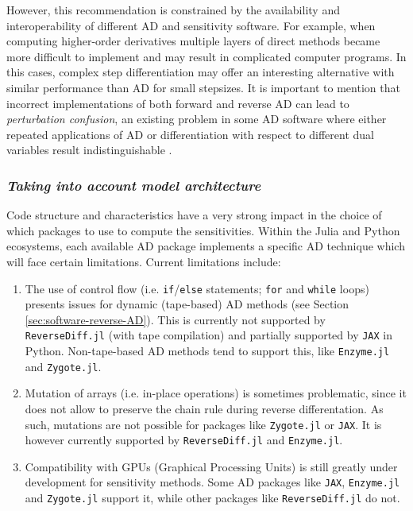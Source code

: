 However, this recommendation is constrained by the availability and interoperability of different AD and sensitivity software. 
For example, when computing higher-order derivatives multiple layers of direct methods became more difficult to implement and may result in complicated computer programs.
In this cases, complex step differentiation may offer an interesting alternative with similar performance than AD for small stepsizes. 
It is important to mention that incorrect implementations of both forward and reverse AD can lead to \textit{perturbation confusion}, an existing problem in some AD software where either repeated applications of AD or differentiation with respect to different dual variables result indistinguishable \cite{siskind2005perturbation, manzyuk2019perturbation}. 


\subsubsection*{\textit{Taking into account model architecture}}

Code structure and characteristics have a very strong impact in the choice of which packages to use to compute the sensitivities. 
Within the Julia and Python ecosystems, each available AD package implements a specific AD technique which will face certain limitations.
Current limitations include:
\begin{enumerate}[label=(\roman*)]
    \item The use of control flow (i.e. \texttt{if}/\texttt{else} statements; \texttt{for} and \texttt{while} loops) presents issues for dynamic (tape-based) AD methods (see Section \ref{sec:software-reverse-AD}). 
    This is currently not supported by \texttt{ReverseDiff.jl} (with tape compilation) and partially supported by \texttt{JAX} in Python. 
    Non-tape-based AD methods tend to support this, like \texttt{Enzyme.jl} and \texttt{Zygote.jl}.
    \item Mutation of arrays (i.e. in-place operations) is sometimes problematic, since it does not allow to preserve the chain rule during reverse differentation. As such, mutations are not possible for packages like \texttt{Zygote.jl} or \texttt{JAX}. It is however currently supported by \texttt{ReverseDiff.jl} and \texttt{Enzyme.jl}.
    \item Compatibility with GPUs (Graphical Processing Units) is still greatly under development for sensitivity methods. 
    Some AD packages like \texttt{JAX}, \texttt{Enzyme.jl} and \texttt{Zygote.jl} support it, while other packages like \texttt{ReverseDiff.jl} do not. 
\end{enumerate}

